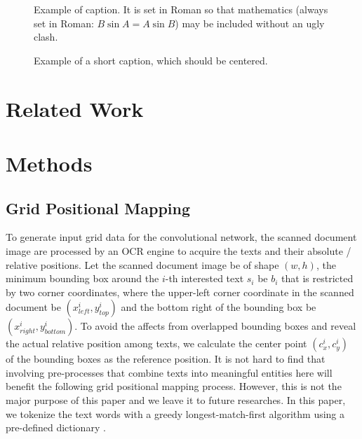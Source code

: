 \documentclass[10pt,twocolumn,letterpaper]{article}
\begin{document}
\begin{figure}[t]
\begin{center}
\fbox{\rule{0pt}{2in} \rule{0.9\linewidth}{0pt}}
\end{center}
   \caption{Example of caption.  It is set in Roman so that mathematics
   (always set in Roman: $B \sin A = A \sin B$) may be included without an
   ugly clash.}
\label{fig:long}
\label{fig:onecol}
\end{figure}

\begin{figure*}
\begin{center}
\fbox{\rule{0pt}{2in} \rule{.9\linewidth}{0pt}}
\end{center}
   \caption{Example of a short caption, which should be centered.}
\label{fig:short}
\end{figure*}

\section{Related Work}

\section{Methods}
\subsection{Grid Positional Mapping}
To generate input grid data for the convolutional network, the scanned document image are processed by an OCR engine to acquire the texts and their absolute / relative positions. Let the scanned document image be of shape $(w, h)$, the minimum bounding box around the $i$-th interested text $s_i$ be $b_i$ that is restricted by two corner coordinates, where the upper-left corner coordinate in the scanned document be $(x^i_{left}, y^i_{top})$ and the bottom right of the bounding box be $(x^i_{right}, y^i_{bottom})$. To avoid the affects from overlapped bounding boxes and reveal the actual relative position among texts, we calculate the center point $(c^i_x, c^i_y)$ of the bounding boxes as the reference position. It is not hard to find that involving pre-processes that combine texts into meaningful entities here will benefit the following grid positional mapping process. However, this is not the major purpose of this paper and we leave it to future researches. In this paper, we tokenize the text words with a greedy longest-match-first algorithm using a pre-defined dictionary \cite{bertgit}. 
\end{document}
